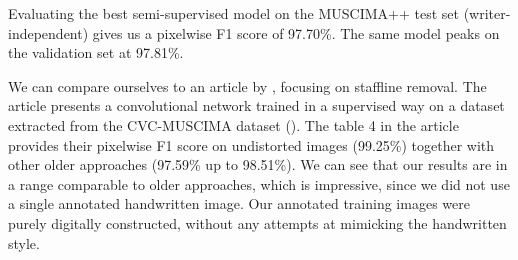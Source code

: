 Evaluating the best semi-supervised model on the MUSCIMA++ test set (writer-independent) gives us a pixelwise F1 score of 97.70\%. The same model peaks on the validation set at 97.81\%. 

We can compare ourselves to an article by \cite{StafflineDetection}, focusing on staffline removal. The article presents a convolutional network trained in a supervised way on a dataset extracted from the CVC-MUSCIMA dataset (\cite{CvcMuscima}). The table 4 in the article provides their pixelwise F1 score on undistorted images (99.25\%) together with other older approaches (97.59\% up to 98.51\%). We can see that our results are in a range comparable to older approaches, which is impressive, since we did not use a single annotated handwritten image. Our annotated training images were purely digitally constructed, without any attempts at mimicking the handwritten style.

